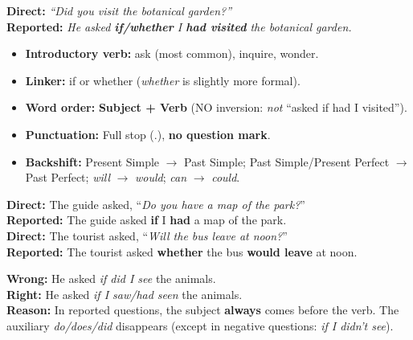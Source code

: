 \documentclass[11pt]{article}
\newcommand{\cle}[1]{{\popxbold\color{popdark}#1}}
\begin{document}
\begin{propriete}
\textbf{Direct:} \emph{``Did you visit the botanical garden?''} \\
\textbf{Reported:} \emph{He asked \textbf{if/whether} I \textbf{had visited} the botanical garden.}
\begin{itemize}
    \item \textbf{Introductory verb:} \cle{ask} (most common), \cle{inquire}, \cle{wonder}.
    \item \textbf{Linker:} \cle{if} or \cle{whether} (\emph{whether} is slightly more formal).
    \item \textbf{Word order:} \textbf{Subject + Verb} (NO inversion: \emph{not} ``asked if had I visited'').
    \item \textbf{Punctuation:} Full stop (.), \textbf{no question mark}.
    \item \textbf{Backshift:} Present Simple $\to$ Past Simple; Past Simple/Present Perfect $\to$ Past Perfect; \emph{will} $\to$ \emph{would}; \emph{can} $\to$ \emph{could}.
\end{itemize}
\end{propriete}

\begin{exemplebox}
\textbf{Direct:} The guide asked, ``\emph{Do you have a map of the park?}'' \\
\textbf{Reported:} The guide asked \textbf{if} I \textbf{had} a map of the park. \\[4pt]
\textbf{Direct:} The tourist asked, ``\emph{Will the bus leave at noon?}'' \\
\textbf{Reported:} The tourist asked \textbf{whether} the bus \textbf{would leave} at noon.
\end{exemplebox}

\begin{attention}
\textbf{Wrong:} He asked \emph{if did I see} the animals. \\
\textbf{Right:} He asked \emph{if I saw/had seen} the animals. \\
\textbf{Reason:} In reported questions, the subject \textbf{always} comes before the verb. The auxiliary \emph{do/does/did} disappears (except in negative questions: \emph{if I didn't see}).
\end{attention}
\end{document}
